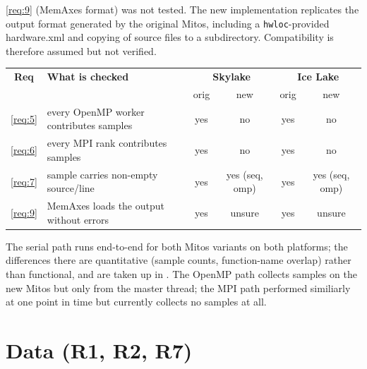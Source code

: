 \ref{req:9} (MemAxes format) was not tested. The new implementation replicates the output format generated by the original Mitos, including a \texttt{hwloc}-provided hardware.xml and copying of source files to a subdirectory. Compatibility is therefore assumed but not verified.

\begin{table}[h]
    \centering
    \small
    \begin{tabular}{@{}clcccc@{}}
        \textbf{Req} & \textbf{What is checked}                & \multicolumn{2}{c}{\textbf{Skylake}} & \multicolumn{2}{c}{\textbf{Ice Lake}}                         \\
                     &                                         & orig                                 & new                                   & orig & new            \\
        \hline
        \ref{req:5}  & every OpenMP worker contributes samples & yes                                  & no                                    & yes  & no             \\
        \ref{req:6}  & every MPI rank contributes samples      & yes                                  & no                                    & yes  & no             \\
        \ref{req:7}  & sample carries non-empty source/line    & yes                                  & yes (seq, omp)                        & yes  & yes (seq, omp) \\
        \ref{req:9}  & MemAxes loads the output without errors & yes                                  & unsure                                & yes  & unsure         \\
    \end{tabular}
    \label{tab:eval-functional}
\end{table}

The serial path runs end-to-end for both Mitos variants on both platforms; the differences there are quantitative (sample counts, function-name overlap) rather than functional, and are taken up in . The OpenMP path collects samples on the new Mitos but only from the master thread; the MPI path performed similiarly at one point in time but currently collects no samples at all.

\section{Data (R1, R2, R7)}\label{sec:eval-fidelity}

